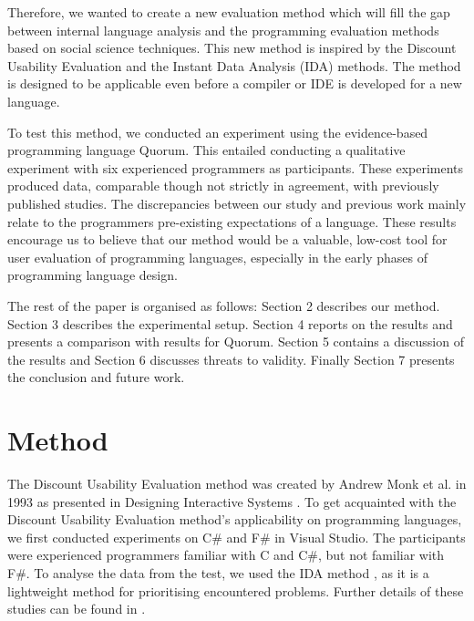 \documentclass[preprint,10pt]{sigplanconf}
\begin{document}
Therefore, we wanted to create a new evaluation method which will fill the gap between 
internal language analysis and the programming evaluation methods based on social science techniques. %
This new method is inspired by the Discount Usability Evaluation and the Instant Data Analysis (IDA) methods. %
The method is designed to be applicable even before a compiler or IDE is developed for a new language.

To test this method, we conducted an experiment using the evidence-based programming language Quorum. This entailed conducting a qualitative experiment with six experienced programmers as participants. These experiments 
produced data, comparable though not strictly in agreement, with previously published studies. The discrepancies between our study and previous work mainly relate to the programmers pre-existing expectations of a language. 
These results encourage us to believe that our method would be a valuable, low-cost tool for user evaluation of programming languages, especially in the early phases of programming language design.


The rest of the paper is organised as follows: Section 2 describes our method. Section 3 describes the experimental setup. Section 4 reports on the results and presents a comparison with results for Quorum. 
Section 5 contains a discussion of the results and Section 6 discusses threats to validity.
Finally Section 7 presents the conclusion and future work.


\section{Method}
The Discount Usability Evaluation method was created by Andrew Monk et al. in 1993 as presented in Designing Interactive Systems \cite{CooperativeEval}.
To get acquainted with the Discount Usability Evaluation method’s applicability on programming languages, we first conducted experiments on C\# and F\# in Visual Studio. The participants were experienced programmers familiar with C and C\#, but not familiar with F\#.  To analyse the data from the test, we used the IDA method \cite{IDA}, as it is a lightweight method for prioritising encountered problems.
Further details of these studies can be found in \cite{thesis}.
\end{document}
